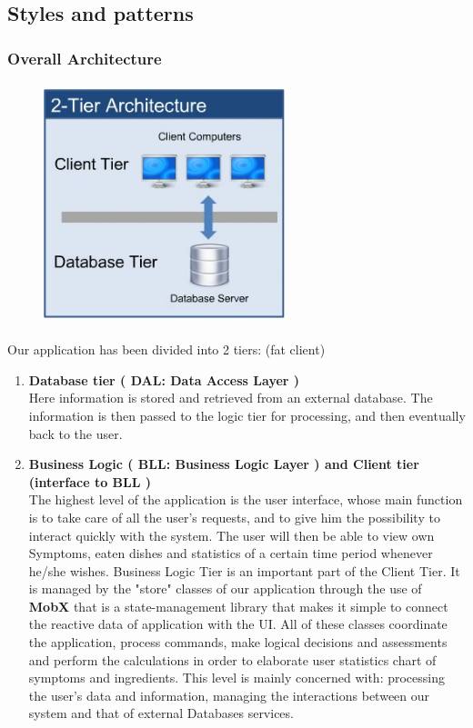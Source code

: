 \documentclass [12pt]{article}
\begin{document}
\subsection{Styles and patterns}
\subsubsection{Overall Architecture}

\begin{figure}[ht!]
\centering
\includegraphics[height=7cm, width=7cm]{2tier.jpg}
\end{figure}  
Our application has been divided into 2 tiers: (fat client)
\begin{enumerate}
\item \textbf{Database tier ( DAL: Data Access Layer )}\\
Here information is stored and retrieved from an external database. The information is then passed to the logic tier for processing, and then eventually back to the user.
\item \textbf{Business Logic ( BLL: Business Logic Layer ) and Client tier (interface to BLL )} 
\\
The highest level of the application is the user interface, whose main function is to take care of all the user's requests, and to give him the possibility to interact quickly with the system.
The user will then be able to view own Symptoms, eaten dishes and statistics of a certain time period whenever he/she wishes.
Business Logic Tier is an important part of the Client Tier. 
It is managed by the "store" classes of our application through the use of \textbf{MobX} that is a state-management library that makes it simple to connect the reactive data of application with the UI.
All of these classes coordinate the application, process commands, make logical decisions and assessments and perform the calculations in order to elaborate user statistics chart of symptoms and ingredients. This level is mainly concerned with: processing the user's data and information, managing the interactions between our system and that of external Databases services.
\end{enumerate}
\clearpage
\end{document}
